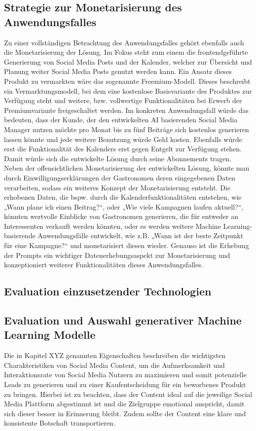\subsection{Strategie zur Monetarisierung des Anwendungsfalles}
Zu einer vollständigen Betrachtung des Anwendungsfalles gehört ebenfalls auch die Monetarisierung der Lösung.
Im Fokus steht zum einem die frontendgeführte Generierung von Social Media Posts und der Kalender, welcher zur Übersicht und Planung weiter Social Media Posts genutzt werden kann.
Ein Ansatz dieses Produkt zu vermarkten wäre das sogenannte Freemium-Modell.
Dieses beschreibt ein Vermarktungsmodell, bei dem eine kostenlose Basisvariante des Produktes zur Verfügung steht und weitere, bzw. vollwertige Funktionalitäten bei Erwerb der Premiumvariante freigeschaltet werden.
Im konkreten Anwendungsfall würde das bedeuten, dass der Kunde, der den entwickelten AI basierenden Social Media Manager nutzen möchte pro Monat bis zu fünf Beiträge sich kostenlos generieren lassen könnte und jede weitere Benutzung würde Geld kosten.
Ebenfalls würde erst die Funktionalität des Kalenders erst gegen Entgelt zur Verfügung stehen.
Damit würde sich die entwickelte Lösung durch seine Abonnements tragen.
Neben der offensichtlichen Monetarisierung der entwickelten Lösung, könnte man durch Einwilligungserklärungen der Gastronomen deren eingegebenen Daten verarbeiten, sodass ein weiteres Konzept der Monetarisierung entsteht.
Die erhobenen Daten, die bspw. durch die Kalenderfunktionalitäten entstehen, wie „Wann plane ich einen Beitrag?“, oder „Wie viele Kampagnen laufen aktuell?“, könnten wertvolle Einblicke von Gastronomen generieren, die für entweder an Interessenten verkauft werden könnten, oder es werden weitere Machine Learning-basierende Anwendungsfälle entwickelt, wie z.B. „Wann ist der beste Zeitpunkt für eine Kampagne?“ und monetarisiert diesen wieder.
Genauso ist die Erhebung der Prompts ein wichtiger Datenerhebungsaspekt zur Monetarisierung und konzeptioniert weiterer Funktionalitäten dieses Anwendungsfalles.


\subsection{Evaluation einzusetzender Technologien}

\subsection{Evaluation und Auswahl generativer Machine Learning Modelle}
Die in Kapitel XYZ genannten Eigenschaften beschreiben die wichtigsten Charakteristiken von Social Media Content, um die Aufmerksamkeit und Interaktionsrate von Social Media Nutzern zu maximieren und somit potenzielle Leads zu generieren und zu einer Kaufentscheidung für ein beworbenes Produkt zu bringen.
Hierbei ist zu beachten, dass der Content ideal auf die jeweilige Social Media Plattform abgestimmt ist und die Zielgruppe emotional anspricht, damit sich dieser besser in Erinnerung bleibt.
Zudem sollte der Content eine klare und konsistente Botschaft transportieren.

